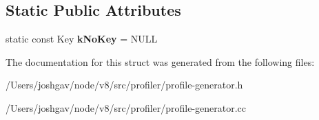 \subsection*{Static Public Attributes}
\begin{DoxyCompactItemize}
\item 
static const Key {\bfseries k\+No\+Key} = N\+U\+LL\hypertarget{structv8_1_1internal_1_1_code_map_1_1_code_tree_config_a959bb125acc2d62e1df2a3a96a9859de}{}\label{structv8_1_1internal_1_1_code_map_1_1_code_tree_config_a959bb125acc2d62e1df2a3a96a9859de}

\end{DoxyCompactItemize}


The documentation for this struct was generated from the following files\+:\begin{DoxyCompactItemize}
\item 
/\+Users/joshgav/node/v8/src/profiler/profile-\/generator.\+h\item 
/\+Users/joshgav/node/v8/src/profiler/profile-\/generator.\+cc\end{DoxyCompactItemize}
